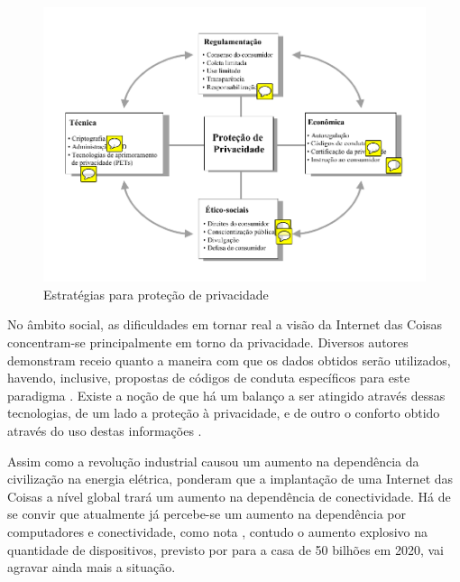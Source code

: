 \documentclass[twoside,english,brazilian]{UNISINOSmonografia}
\begin{document}
\begin{figure}
	\caption{Estratégias para proteção de privacidade}
	\label{fig:iot-privacy}
	\centering
	\begin{minipage}{.8\textwidth}
		\includegraphics[width=\textwidth,keepaspectratio=true]{ITU_privacy[107]}
	\end{minipage}
\end{figure}


No âmbito social, as dificuldades em tornar real a visão da Internet das 
Coisas concentram-se principalmente em torno da privacidade.
Diversos autores demonstram receio quanto a maneira com que os dados obtidos 
serão utilizados, havendo, inclusive, propostas de códigos de conduta 
específicos para este paradigma \cite{ITU2005}.
Existe a noção de que há um balanço a ser atingido através dessas tecnologias, 
de um lado a proteção à privacidade, e de outro o conforto obtido através do 
uso destas informações \cite{Atzori2010b}.


Assim como a revolução industrial causou um aumento na dependência da 
civilização na energia elétrica,  ponderam que a 
implantação de uma Internet das Coisas a nível global trará um aumento na 
dependência de conectividade.
Há de se convir que atualmente já percebe-se um aumento na dependência por 
computadores e conectividade, como nota , contudo o 
aumento explosivo na quantidade de dispositivos, previsto por 
 para a casa de 50 bilhões em 2020, vai agravar ainda 
mais a situação.
\end{document}
